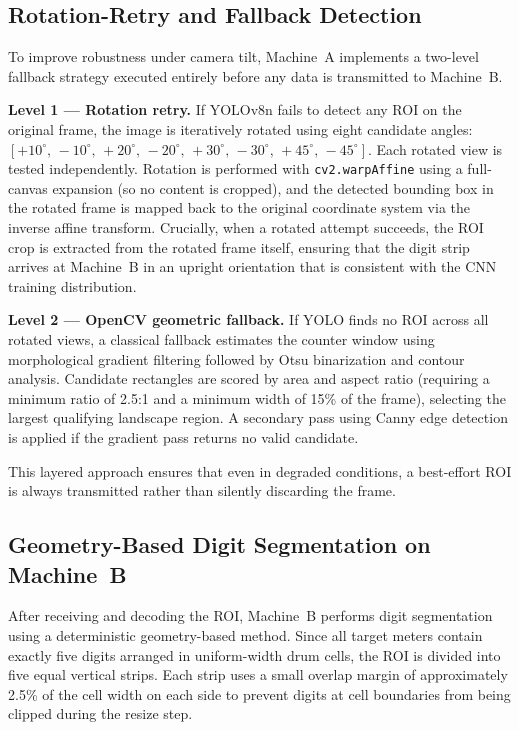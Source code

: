 \documentclass[11pt,a4paper]{article}
\begin{document}
\subsection{Rotation-Retry and Fallback Detection}
To improve robustness under camera tilt, Machine~A implements a two-level fallback strategy executed entirely before any data is transmitted to Machine~B.

\textbf{Level 1 — Rotation retry.}
If YOLOv8n fails to detect any ROI on the original frame, the image is iteratively rotated using eight candidate angles: $[+10^\circ,\,-10^\circ,\,+20^\circ,\,-20^\circ,\,+30^\circ,\,-30^\circ,\,+45^\circ,\,-45^\circ]$. Each rotated view is tested independently. Rotation is performed with \texttt{cv2.warpAffine} using a full-canvas expansion (so no content is cropped), and the detected bounding box in the rotated frame is mapped back to the original coordinate system via the inverse affine transform. Crucially, when a rotated attempt succeeds, the ROI crop is extracted from the rotated frame itself, ensuring that the digit strip arrives at Machine~B in an upright orientation that is consistent with the CNN training distribution.

\textbf{Level 2 — OpenCV geometric fallback.}
If YOLO finds no ROI across all rotated views, a classical fallback estimates the counter window using morphological gradient filtering followed by Otsu binarization and contour analysis. Candidate rectangles are scored by area and aspect ratio (requiring a minimum ratio of 2.5:1 and a minimum width of 15\% of the frame), selecting the largest qualifying landscape region. A secondary pass using Canny edge detection is applied if the gradient pass returns no valid candidate.

This layered approach ensures that even in degraded conditions, a best-effort ROI is always transmitted rather than silently discarding the frame.

\subsection{Geometry-Based Digit Segmentation on Machine~B}
After receiving and decoding the ROI, Machine~B performs digit segmentation using a deterministic geometry-based method. Since all target meters contain exactly five digits arranged in uniform-width drum cells, the ROI is divided into five equal vertical strips. Each strip uses a small overlap margin of approximately 2.5\% of the cell width on each side to prevent digits at cell boundaries from being clipped during the resize step.
\end{document}
